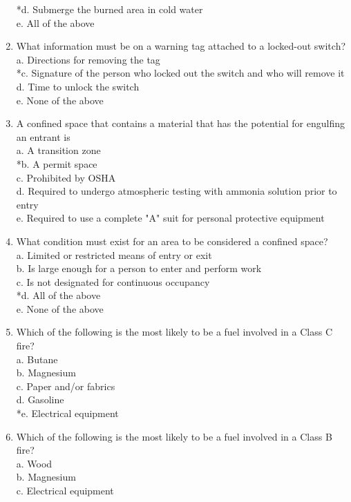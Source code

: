 \begin{enumerate}[1.]
*d. Submerge the burned area in cold water\\
e. All of the above\\
\item What information must be on a warning tag attached to a locked-out switch?\\
a. Directions for removing the tag\\
*c. Signature of the person who locked out the switch and who will remove it\\
d. Time to unlock the switch\\
e. None of the above\\
\item A confined space that contains a material that has the potential for engulfing an entrant is\\
a. A transition zone\\
*b. A permit space\\
c. Prohibited by OSHA\\
d. Required to undergo atmospheric testing with ammonia solution prior to entry\\
e. Required to use a complete "A" suit for personal protective equipment\\
\item What condition must exist for an area to be considered a confined space?\\
a. Limited or restricted means of entry or exit\\
b. Is large enough for a person to enter and perform work\\
c. Is not designated for continuous occupancy\\
*d. All of the above\\
e. None of the above\\
\item Which of the following is the most likely to be a fuel involved in a Class C fire?\\
a. Butane\\
b. Magnesium\\
c. Paper and/or fabrics\\
d. Gasoline\\
*e. Electrical equipment\\
\item Which of the following is the most likely to be a fuel involved in a Class B fire?\\
a. Wood\\
b. Magnesium\\
c. Electrical equipment\\

\end{enumerate}
